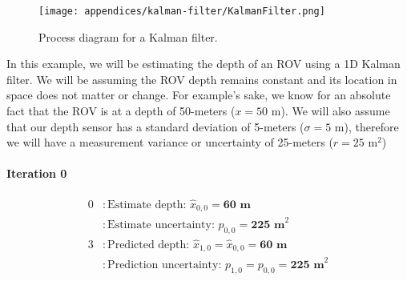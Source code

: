 \begin{figure}[h!]
    \texttt{[image: appendices/kalman-filter/KalmanFilter.png]}
    \caption[Kalman Filter Diagram]{Process diagram for a Kalman filter.}
\end{figure}

\begin{fitbox}[frametitle=Example]
    In this example, we will be estimating the depth of an ROV using a 1D Kalman filter.
    We will be assuming the ROV depth remains constant and its location in space does not matter or change.
    For example's sake, we know for an absolute fact that the ROV is at a depth of 50-meters ($x=50 \text{ m}$).
    We will also assume that our depth sensor has a standard deviation of 5-meters ($\sigma=5 \text{ m}$), therefore we will have a measurement variance or uncertainty of 25-meters ($r=25 \text{ m}^2$)

    \paragraph*{Iteration 0}
    \begin{equation*}
        \begin{aligned}
            0 &: \text{Estimate depth: } \hat{x}_{0,0} = \textbf{60 m} \\
                &: \text{Estimate uncertainty: } p_{0,0} = \textbf{225 m}^2 \\
            3 &: \text{Predicted depth: } \hat{x}_{1,0} = \hat{x}_{0,0} = \textbf{60 m} \\
                &: \text{Prediction uncertainty: } p_{1,0} = p_{0,0} = \textbf{225 m}^2 \\
        \end{aligned}
    \end{equation*}


\end{fitbox}
